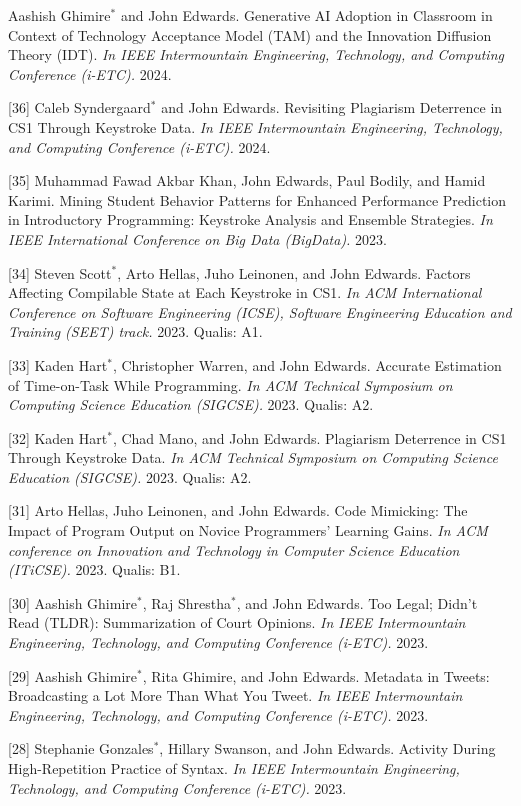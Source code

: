 \documentclass[margin,line]{res}
\newcommand{\cnum}[1]{[#1]}
\begin{document}
\begin{resume}
\cnum{37} Aashish Ghimire$^*$ and John Edwards. Generative AI Adoption in Classroom in Context of Technology Acceptance Model (TAM) and the Innovation Diffusion Theory (IDT). \textit{In IEEE Intermountain Engineering, Technology, and Computing Conference (i-ETC).} 2024.

\cnum{36} Caleb Syndergaard$^*$ and John Edwards. Revisiting Plagiarism Deterrence in CS1 Through Keystroke Data. \textit{In IEEE Intermountain Engineering, Technology, and Computing Conference (i-ETC).} 2024.

\cnum{35} Muhammad Fawad Akbar Khan, John Edwards, Paul Bodily, and Hamid Karimi. Mining Student Behavior Patterns for Enhanced Performance Prediction in Introductory Programming: Keystroke Analysis and Ensemble Strategies. \textit{In IEEE International Conference on Big Data (BigData).} 2023.

\cnum{34} Steven Scott$^*$, Arto Hellas, Juho Leinonen, and John Edwards. Factors Affecting Compilable State at Each Keystroke in CS1. \textit{In ACM International Conference on Software Engineering (ICSE), Software Engineering Education and Training (SEET) track.} 2023. Qualis: A1.

\cnum{33} Kaden Hart$^*$, Christopher Warren, and John Edwards. Accurate Estimation of Time-on-Task While Programming. \textit{In ACM Technical Symposium on Computing Science Education (SIGCSE).} 2023. Qualis: A2.

\cnum{32} Kaden Hart$^*$, Chad Mano, and John Edwards. Plagiarism Deterrence in CS1 Through Keystroke Data. \textit{In ACM Technical Symposium on Computing Science Education (SIGCSE).} 2023. Qualis: A2.

\cnum{31} Arto Hellas, Juho Leinonen, and John Edwards. Code Mimicking: The Impact of Program Output on Novice Programmers’ Learning Gains. \textit{In ACM conference on Innovation and Technology in Computer Science Education (ITiCSE).} 2023. Qualis: B1.

\cnum{30} Aashish Ghimire$^*$, Raj Shrestha$^*$, and John Edwards. Too Legal; Didn’t Read (TLDR): Summarization of Court Opinions. \textit{In IEEE Intermountain Engineering, Technology, and Computing Conference (i-ETC).} 2023.

\cnum{29} Aashish Ghimire$^*$, Rita Ghimire, and John Edwards. Metadata in Tweets: Broadcasting a Lot More Than What You Tweet. \textit{In IEEE Intermountain Engineering, Technology, and Computing Conference (i-ETC).} 2023.

\cnum{28} Stephanie Gonzales$^*$, Hillary Swanson, and John Edwards. Activity During High-Repetition Practice of Syntax. \textit{In IEEE Intermountain Engineering, Technology, and Computing Conference (i-ETC).} 2023.


\end{resume}
\end{document}
